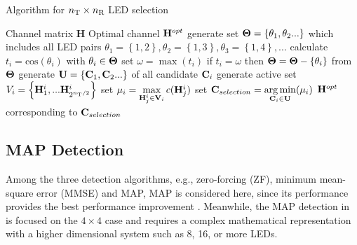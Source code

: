 \documentclass[12pt,letterpaper]{IEEEtran}
\begin{document}
\begin{algorithm}[]
	\caption{Algorithm for $n_{\text T} \times  n_{\text R}$ LED selection}
	\label{algo2}
	\begin{algorithmic}[1]
		\renewcommand{\algorithmicrequire}{\textbf{Input:}}
		\renewcommand{\algorithmicensure}{\textbf{Output:}}
		\REQUIRE Channel matrix {\bfseries{H}}
		\ENSURE  Optimal channel ${{\bf{H}}^{opt}}$
		\STATE generate set ${\bf{\Theta }} = \left\{ {{\theta _1},{\theta _2}...} \right\}$ which includes all LED pairs ${\theta _1} = \left\{ {1,2} \right\},{\theta _2} = \left\{ {1,3} \right\},{\theta _3} = \left\{ {1,4} \right\},...$
		\STATE calculate ${t_i} = \textrm{cos} ({\theta _i})$ with ${\theta _i} \in {\bf{\Theta }}$
		\STATE set $\omega  = \max ({t_i})$
		\STATE if ${t_i} = \omega $ then ${\bf{\Theta }} = {\bf{\Theta }} - \{{\theta _i}\}$
		\STATE from ${\bf{\Theta }}$ generate ${\bf{U}} = \left\{ {{{\bf{C}}_1},{{\bf{C}}_2}...} \right\}$ of all candidate ${{\bf{C}}_i}$
		\STATE generate active set ${V_i} = \left\{ {{\bf{H}}_1^i,...{\bf{H}}_{{2^{{n_{\text{T}}}/2}}}^i} \right\}$
		\STATE set ${\mu _i} = \mathop {\max }\limits_{{\bf{H}}_j^i \in {{\bf{V}}_i}} c({\bf{H}}_j^i)$
		\ENDFOR	
		\STATE set ${{\bf{C}}_{selection}} = \mathop {\arg \min }\limits_{{{\bf{C}}_i} \in {\bf{U}}} ({\mu _i})$
		\RETURN ${{\bf{H}}^{opt}}$ corresponding to ${{\bf{C}}_{selection}}$
	\end{algorithmic} 
\end{algorithm}
\subsection{MAP Detection}
Among the three detection algorithms, e.g., zero-forcing (ZF), minimum mean-square error (MMSE) and MAP, MAP is considered here, since its performance provides the best performance improvement \cite{yesilkaya_optical_2017}. Meanwhile, the MAP detection in \cite{yesilkaya_optical_2017} is focused on the $4\times4$ case and requires a complex mathematical representation with a higher dimensional system such as 8, 16, or more LEDs.
\end{document}
